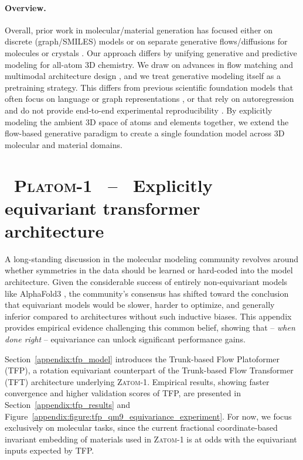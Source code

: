 \documentclass{article}
\theoremstyle{plain}
\theoremstyle{definition}
\theoremstyle{remark}
\begin{document}
\paragraph{Overview.} Overall, prior work in molecular/material generation has focused either on discrete (graph/SMILES) models or on separate generative flows/diffusions for molecules or crystals \citep{hoogeboom2022equivariant, xie2022crystal}. Our approach differs by unifying generative and predictive modeling for all-atom 3D chemistry. We draw on advances in flow matching and multimodal architecture design \citep{song2023equivariant, miller2024flowmm, vonessen2025tabasco}, and we treat generative modeling itself as a pretraining strategy. This differs from previous scientific foundation models that often focus on language or graph representations \citep{PyzerKnapp2025, Choi2025FMchem, wadell2025foundation}, or that rely on autoregression and do not provide end-to-end experimental reproducibility \citep{zhang2025unigenx}. By explicitly modeling the ambient 3D space of atoms and elements together, we extend the flow-based generative paradigm to create a single foundation model across 3D molecular and material domains.

\section{\ \textsc{Platom-1} \ -- \ Explicitly equivariant transformer architecture}
\label{appendix:tfp_main}

A long-standing discussion in the molecular modeling community revolves around whether symmetries in the data should be learned or hard-coded into the model architecture.
Given the considerable success of entirely non-equivariant models like AlphaFold3 \citep{abramson2024accurate}, the community's consensus has shifted toward the conclusion that equivariant models would be slower, harder to optimize, and generally inferior compared to architectures without such inductive biases. This appendix provides empirical evidence challenging this common belief, showing that -- \emph{when done right} -- equivariance can unlock significant performance gains.

Section~\ref{appendix:tfp_model} introduces the Trunk-based Flow Platoformer (TFP),
a rotation equivariant counterpart of the Trunk-based Flow Transformer (TFT) architecture underlying \textsc{Zatom-1}. Empirical results, showing faster convergence and higher validation scores of TFP, are presented in Section~\ref{appendix:tfp_results} and Figure~\ref{appendix:figure:tfp_qm9_equivariance_experiment}. For now, we focus exclusively on molecular tasks, since the current fractional coordinate-based invariant embedding of materials used in \textsc{Zatom-1} is at odds with the equivariant inputs expected by TFP.
\end{document}

